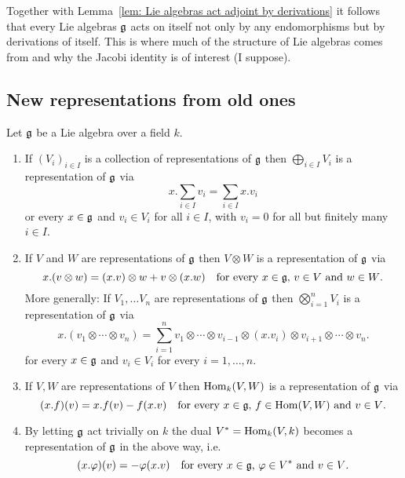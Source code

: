 \begin{rem}
 Together with Lemma~\ref{lem: Lie algebras act adjoint by derivations} it follows that every Lie algebras $\mathfrak{g}$ acts on itself not only by any endomorphisms but by derivations of itself. This is where much of the structure of Lie algebras comes from and why the Jacobi identity is of interest (I suppose).
\end{rem}





\subsection{New representations from old ones}


\begin{prop}
 Let $\mathfrak{g}$ be a Lie algebra over a field $k$.
 \begin{enumerate}[leftmargin=*]
  \item
   If $(V_i)_{i \in I}$ is a collection of representations of $\mathfrak{g}$ then $\bigoplus_{i \in I} V_i$ is a representation of $\mathfrak{g}$ via
   \[
    x.\sum_{i \in I} v_i = \sum_{i \in I} x.v_i
   \]
   or every $x \in \mathfrak{g}$ and $v_i \in V_i$ for all $i \in I$, with $v_i = 0$ for all but finitely many $i \in I$.
  \item
   If $V$ and $W$ are representations of $\mathfrak{g}$ then $V \otimes W$ is a representation of $\mathfrak{g}$ via
   \[
    x.(v \otimes w) = (x.v) \otimes w + v \otimes (x.w) \quad \text{for every $x \in \mathfrak{g}$, $v \in V$ and $w \in W$}.
   \]
   More generally: If $V_1, \dotsc V_n$ are representations of $\mathfrak{g}$ then $\bigotimes_{i=1}^n V_i$ is a representation of $\mathfrak{g}$ via
   \[
    x.(v_1 \otimes \dotsb \otimes v_n)
    = \sum_{i=1}^n v_1 \otimes \dotsb \otimes v_{i-1} \otimes (x.v_i) \otimes v_{i+1} \otimes \dotsb \otimes v_n.
   \]
   for every $x \in \mathfrak{g}$ and $v_i \in V_i$ for every $i = 1, \dotsc, n$.
  \item
   If $V, W$ are representations of $V$ then $\operatorname{Hom}_k(V,W)$ is a representation of $\mathfrak{g}$ via
   \[
    (x.f)(v) = x.f(v) - f(x.v) \quad \text{for every $x \in \mathfrak{g}$, $f \in \operatorname{Hom}(V,W)$ and $v \in V$}.
   \]
  \item
   By letting $\mathfrak{g}$ act trivially on $k$ the dual $V^* = \operatorname{Hom}_k(V,k)$ becomes a representation of $\mathfrak{g}$ in the above way, i.e.
   \[
    (x.\varphi)(v) = -\varphi(x.v) \quad \text{for every $x \in \mathfrak{g}$, $\varphi \in V^*$ and $v \in V$}.
   \]
 \end{enumerate}
\end{prop}



